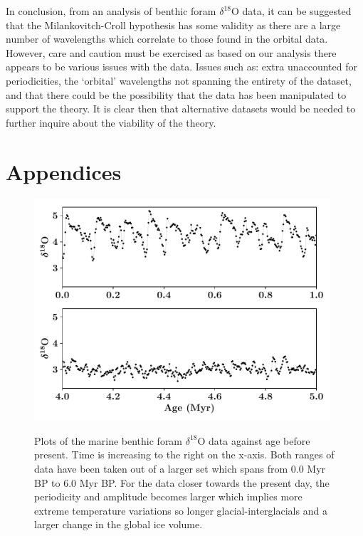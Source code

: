 \documentclass[12pt, onecolumn]{revtex4}    %
\begin{document}
In conclusion, from an analysis of benthic foram $\delta^{18}$O data, it can be suggested that the Milankovitch-Croll hypothesis has some validity as there are a large number of wavelengths which correlate to those found in the orbital data. However, care and caution must be exercised as based on our analysis there appears to be various issues with the data. Issues such as: extra unaccounted for periodicities, the `orbital' wavelengths not spanning the entirety of the dataset, and that there could be the possibility that the data has been manipulated to support the theory. It is clear then that alternative datasets would be needed to further inquire about the viability of the theory.

\newpage





\newpage

\section*{Appendices}
\begin{figure}[!h]
\begin{center}
\includegraphics[width=11cm]{figures/foram_data}
\caption[]{Plots of the marine benthic foram $\delta^{18}$O data against age before present. Time is increasing to the right on the x-axis. Both ranges of data have been taken out of a larger set which spans from 0.0 Myr BP to 6.0 Myr BP. For the data closer towards the present day, the periodicity and amplitude becomes larger which implies more extreme temperature variations so longer glacial-interglacials and a larger change in the global ice volume.}
\vspace{-3ex}
\label{fig:foram_data}
\end{center}
\end{figure}
\end{document}

